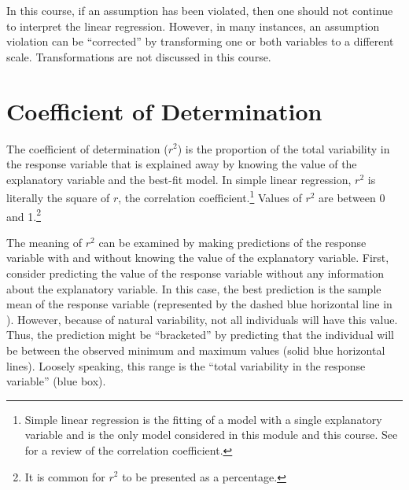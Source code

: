 \documentclass[10pt,openany]{book}\usepackage[]{graphicx}\usepackage[]{color}
\begin{document}
In this course, if an assumption has been violated, then one should not continue to interpret the linear regression. However, in many instances, an assumption violation can be ``corrected'' by transforming one or both variables to a different scale. Transformations are not discussed in this course.



\section{Coefficient of Determination}
The coefficient of determination ($r^{2}$) is the proportion of the total variability in the response variable that is explained away by knowing the value of the explanatory variable and the best-fit model. In simple linear regression, $r^{2}$ is literally the square of $r$, the correlation coefficient.\footnote{Simple linear regression is the fitting of a model with a single explanatory variable and is the only model considered in this module and this course. See  for a review of the correlation coefficient.} Values of $r^{2}$ are between 0 and 1.\footnote{It is common for $r^{2}$ to be presented as a percentage.}

The meaning of $r^{2}$ can be examined by making predictions of the response variable with and without knowing the value of the explanatory variable. First, consider predicting the value of the response variable without any information about the explanatory variable. In this case, the best prediction is the sample mean of the response variable (represented by the dashed blue horizontal line in ). However, because of natural variability, not all individuals will have this value. Thus, the prediction might be ``bracketed'' by predicting that the individual will be between the observed minimum and maximum values (solid blue horizontal lines). Loosely speaking, this range is the ``total variability in the response variable'' (blue box).
\end{document}
